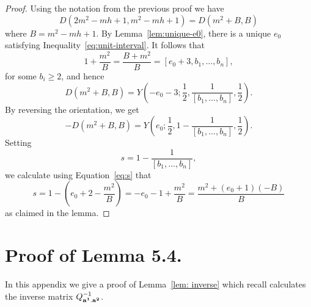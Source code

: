 \documentclass[11pt]{amsart}
\theoremstyle{plain}
\theoremstyle{definition}
\theoremstyle{remark}
\numberwithin{theorem}{section}
\begin{document}
\begin{proof}
Using the notation from the previous proof we have
$$
D(2m^2-mh+1, m^2-mh+1)=D(m^2+B, B)
$$ 
where $B=m^{2}-mh+1$. By Lemma~\ref{lem:unique-e0}, there is a unique $e_0$ satisfying Inequality~\eqref{eq:unit-interval}. It follows that 
\begin{equation} \label{eq:s}
1+\dfrac{m^2}{B}=
\dfrac{B+m^2}{B}=[e_0+3, b_1, \ldots, b_n],
\end{equation} 
for some $b_i\geq 2$, and hence 
$$
D(m^2+B, B)=Y\left(-e_0-3; \dfrac{1}{2}, \dfrac{1}{[b_1, \ldots, b_n]}, \dfrac{1}{2}\right).
$$ 
By reversing the orientation, we get 
 $$
 -D(m^2+B, B)=Y\left(e_0; \dfrac{1}{2}, 1-\dfrac{1}{[b_1, \ldots, b_n]}, \dfrac{1}{2}\right).
 $$ 
 Setting
 $$s=1-\dfrac{1}{[b_1, \ldots, b_n]},$$ 
 we calculate using Equation~\eqref{eq:s} that 
 $$s=1-\left(e_0+2-\dfrac{m^2}{B}\right)=-e_0-1+\dfrac{m^2}{B}=\dfrac{m^2+(e_0+1)(-B)}{B}$$ 
as claimed in the lemma.
\end{proof}

\appendix

\section{Proof of Lemma 5.4.}\label{app}

In this appendix we give a proof of Lemma~\ref{lem: inverse} which recall calculates the inverse matrix $Q^{-1}_{{\bf a^1}. {\bf a^2}}$. 
\end{document}
